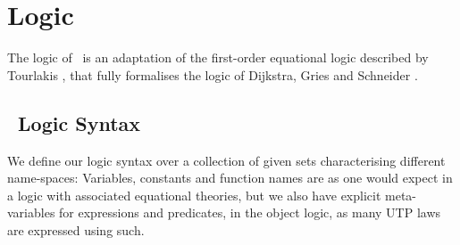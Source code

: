 \section{Logic}\label{sec:logic}


The logic of \ is an adaptation of the first-order equational logic
described by Tourlakis \cite{journals/logcom/Tourlakis01},
that fully formalises the logic of Dijkstra, Gries and Schneider \cite{gries.93}.
\subsection{\ Logic Syntax}

We define our logic syntax
over a collection of given sets characterising different name-spaces:
Variables, constants and function names are as one would expect
in a logic with associated equational theories,
but we also have explicit meta-variables for expressions
and predicates, in the object logic, as many UTP laws
are expressed using such.

